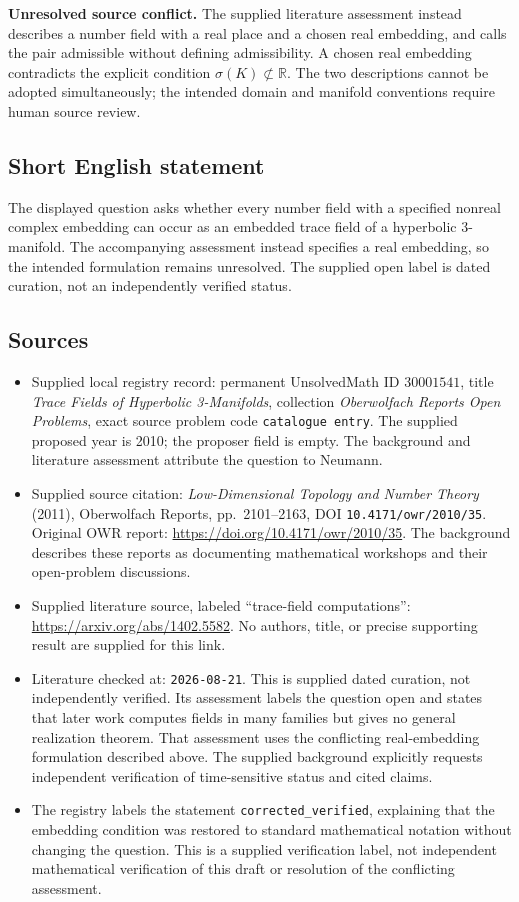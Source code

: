 \documentclass[11pt]{article}
\newcommand{\R}{\mathbb{R}}
\begin{document}
\textbf{Unresolved source conflict.} The supplied literature assessment instead describes a number field with a real place and a chosen real embedding, and calls the pair admissible without defining admissibility. A chosen real embedding contradicts the explicit condition \(\sigma(K)\not\subset\R\). The two descriptions cannot be adopted simultaneously; the intended domain and manifold conventions require human source review.
\subsection{Short English statement}
The displayed question asks whether every number field with a specified nonreal complex embedding can occur as an embedded trace field of a hyperbolic \(3\)-manifold. The accompanying assessment instead specifies a real embedding, so the intended formulation remains unresolved. The supplied open label is dated curation, not an independently verified status.
\subsection{Sources}
\begin{itemize}
\item Supplied local registry record: permanent UnsolvedMath ID \(30001541\), title \emph{Trace Fields of Hyperbolic 3-Manifolds}, collection \emph{Oberwolfach Reports Open Problems}, exact source problem code \texttt{catalogue entry}. The supplied proposed year is 2010; the proposer field is empty. The background and literature assessment attribute the question to Neumann.
\item Supplied source citation: \emph{Low-Dimensional Topology and Number Theory} (2011), Oberwolfach Reports, pp.\ 2101--2163, DOI \texttt{10.4171/owr/2010/35}. Original OWR report: \url{https://doi.org/10.4171/owr/2010/35}. The background describes these reports as documenting mathematical workshops and their open-problem discussions.
\item Supplied literature source, labeled ``trace-field computations'': \url{https://arxiv.org/abs/1402.5582}. No authors, title, or precise supporting result are supplied for this link.
\item Literature checked at: \texttt{2026-08-21}. This is supplied dated curation, not independently verified. Its assessment labels the question open and states that later work computes fields in many families but gives no general realization theorem. That assessment uses the conflicting real-embedding formulation described above. The supplied background explicitly requests independent verification of time-sensitive status and cited claims.
\item The registry labels the statement \texttt{corrected\_verified}, explaining that the embedding condition was restored to standard mathematical notation without changing the question. This is a supplied verification label, not independent mathematical verification of this draft or resolution of the conflicting assessment.
\end{itemize}
\end{document}
